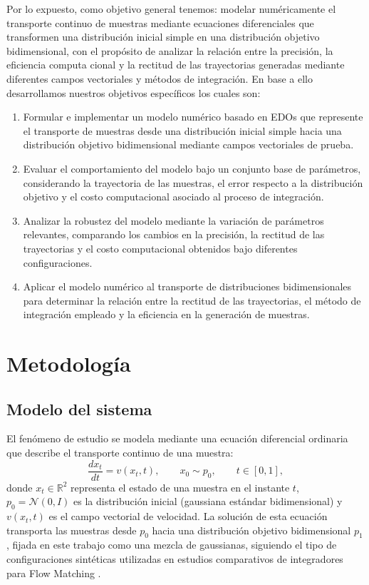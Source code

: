 \documentclass[final,5p,times,twocolumn,authoryear]{elsarticle}
\begin{document}
Por lo expuesto, como objetivo general tenemos: modelar numéricamente el transporte continuo de muestras mediante ecuaciones diferenciales que transformen una distribución inicial simple en una distribución objetivo bidimensional, con el propósito de analizar la relación entre la precisión, la eficiencia computa cional y la rectitud de las trayectorias generadas mediante diferentes campos vectoriales y métodos de integración. En base a ello desarrollamos nuestros objetivos específicos los cuales son:
\begin{enumerate}
\item Formular e implementar un modelo numérico basado en EDOs que represente el transporte de muestras desde una distribución inicial simple hacia una distribución objetivo bidimensional mediante campos vectoriales de prueba.
\item Evaluar el comportamiento del modelo bajo un conjunto base de parámetros, considerando la trayectoria de las muestras, el error respecto a la distribución objetivo y el costo computacional asociado al proceso de integración.

\item Analizar la robustez del modelo mediante la variación de parámetros relevantes, comparando los cambios en la precisión, la rectitud de las trayectorias y el costo computacional obtenidos bajo diferentes configuraciones.

\item Aplicar el modelo numérico al transporte de distribuciones bidimensionales para determinar la relación entre la rectitud de las trayectorias, el método de integración empleado y la eficiencia en la generación de muestras.
\end{enumerate}

\section{Metodología}
\label{sec:metodologia}

\subsection{Modelo del sistema}

El fenómeno de estudio se modela mediante una ecuación diferencial ordinaria que describe el transporte continuo de una muestra:
\begin{equation}
    \frac{dx_t}{dt}=v(x_t,t),
    \qquad x_0\sim p_0,
    \qquad t\in[0,1],
\end{equation}
\noindent donde $x_t\in\mathbb{R}^2$ representa el estado de una muestra en el instante $t$, $p_0=\mathcal{N}(0,I)$ es la distribución inicial (gaussiana estándar bidimensional) y $v(x_t,t)$ es el campo vectorial de velocidad. La solución de esta ecuación transporta las muestras desde $p_0$ hacia una distribución objetivo bidimensional $p_1$, fijada en este trabajo como una mezcla de gaussianas, siguiendo el tipo de configuraciones sintéticas utilizadas en estudios comparativos de integradores para Flow Matching \citep{xiao2026solvers}.
\end{document}
